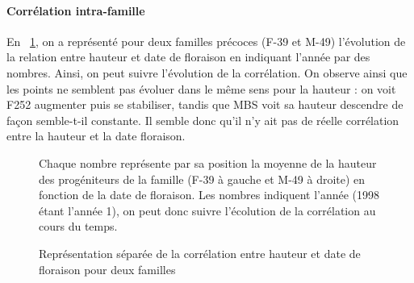 \documentclass[12pt,a4paper]{article}
\begin{document}
			 				\paragraph{Corrélation intra-famille}
			 					
								En ~\ref{correl.fam}, on a représenté pour deux familles précoces (F-39 et M-49) l'évolution de la relation entre hauteur et date de floraison en indiquant l'année par des nombres. Ainsi, on peut suivre l'évolution de la corrélation. On observe ainsi que les points ne semblent pas évoluer dans le même sens pour la hauteur : on voit F252 augmenter puis se stabiliser, tandis que MBS voit sa hauteur descendre de façon semble-t-il constante. Il semble donc qu'il n'y ait pas de réelle corrélation entre la hauteur et la date floraison.
			 				
			 				
			 				\begin{figure}[!h]
			 					\caption{Représentation séparée de la corrélation entre hauteur et date de floraison pour deux familles \label{correl.fam}}
			 					Chaque nombre représente par sa position la moyenne de la hauteur des progéniteurs de la famille (F-39 à gauche et M-49 à droite) en fonction de la date de floraison. Les nombres indiquent l'année (1998 étant l'année 1), on peut donc suivre l'écolution de la corrélation au cours du temps.
			 				\end{figure}
			 				
\end{document}
